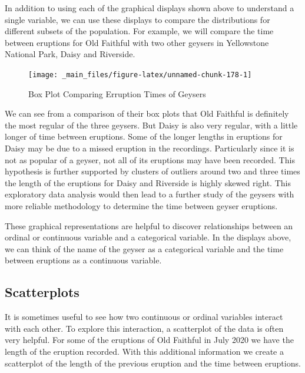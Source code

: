 \documentclass[
]{book}
\theoremstyle{definition}
\theoremstyle{definition}
\theoremstyle{definition}
\theoremstyle{definition}
\theoremstyle{remark}
\begin{document}
In addition to using each of the graphical displays shown above to understand a single variable, we can use these displays to compare the distributions for different subsets of the population. For example, we will compare the time between eruptions for Old Faithful with two other geysers in Yellowstone National Park, Daisy and Riverside.

\begin{figure}

{\centering \texttt{[image: \_main\_files/figure-latex/unnamed-chunk-178-1]} 

}

\caption{Box Plot Comparing Erruption Times of Geysers}\label{fig:unnamed-chunk-178}
\end{figure}

We can see from a comparison of their box plots that Old Faithful is definitely the most regular of the three geysers. But Daisy is also very regular, with a little longer of time between eruptions. Some of the longer lengths in eruptions for Daisy may be due to a missed eruption in the recordings. Particularly since it is not as popular of a geyser, not all of its eruptions may have been recorded. This hypothesis is further supported by clusters of outliers around two and three times the length of the eruptions for Daisy and Riverside is highly skewed right. This exploratory data analysis would then lead to a further study of the geysers with more reliable methodology to determine the time between geyser eruptions.

These graphical representations are helpful to discover relationships between an ordinal or continuous variable and a categorical variable. In the displays above, we can think of the name of the geyser as a categorical variable and the time between eruptions as a continuous variable.

\hypertarget{scatterplots}{%
\subsection{Scatterplots}\label{scatterplots}}

It is sometimes useful to see how two continuous or ordinal variables interact with each other. To explore this interaction, a scatterplot of the data is often very helpful. For some of the eruptions of Old Faithful in July 2020 we have the length of the eruption recorded. With this additional information we create a scatterplot of the length of the previous eruption and the time between eruptions.
\end{document}

